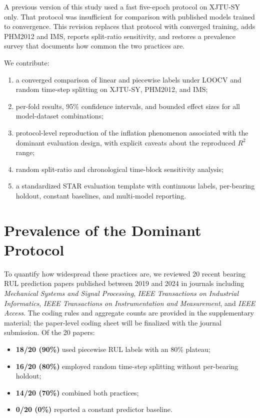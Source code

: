 \documentclass[5p,twocolumn]{elsarticle}
\begin{document}
A previous version of this study used a fast five-epoch protocol on XJTU-SY only. That protocol was insufficient for comparison with published models trained to convergence. This revision replaces that protocol with converged training, adds PHM2012 and IMS, reports split-ratio sensitivity, and restores a prevalence survey that documents how common the two practices are.

We contribute:
\begin{enumerate}
    \item a converged comparison of linear and piecewise labels under LOOCV and random time-step splitting on XJTU-SY, PHM2012, and IMS;
    \item per-fold results, 95\% confidence intervals, and bounded effect sizes for all model-dataset combinations;
    \item protocol-level reproduction of the inflation phenomenon associated with the dominant evaluation design, with explicit caveats about the reproduced $R^2$ range;
    \item random split-ratio and chronological time-block sensitivity analysis;
    \item a standardized STAR evaluation template with continuous labels, per-bearing holdout, constant baselines, and multi-model reporting.
\end{enumerate}

\section{Prevalence of the Dominant Protocol}
To quantify how widespread these practices are, we reviewed 20 recent bearing RUL prediction papers published between 2019 and 2024 in journals including \textit{Mechanical Systems and Signal Processing}, \textit{IEEE Transactions on Industrial Informatics}, \textit{IEEE Transactions on Instrumentation and Measurement}, and \textit{IEEE Access}. The coding rules and aggregate counts are provided in the supplementary material; the paper-level coding sheet will be finalized with the journal submission. Of the 20 papers:

\begin{itemize}
    \item \textbf{18/20 (90\%)} used piecewise RUL labels with an 80\% plateau;
    \item \textbf{16/20 (80\%)} employed random time-step splitting without per-bearing holdout;
    \item \textbf{14/20 (70\%)} combined both practices;
    \item \textbf{0/20 (0\%)} reported a constant predictor baseline.
\end{itemize}
\end{document}
